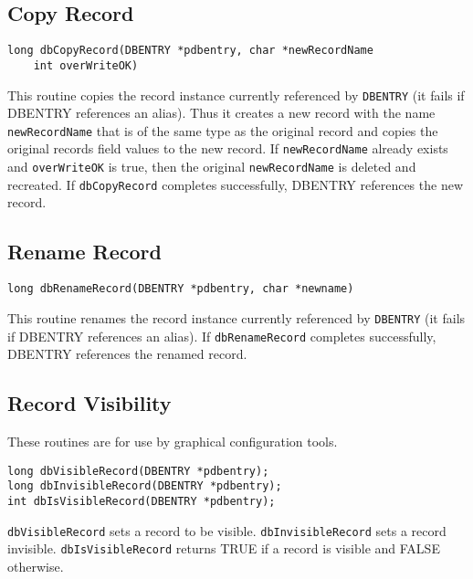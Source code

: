 \subsection{Copy Record}

\begin{verbatim}
long dbCopyRecord(DBENTRY *pdbentry, char *newRecordName
    int overWriteOK)
\end{verbatim}

This routine copies the record instance currently referenced by \verb|DBENTRY| (it fails if DBENTRY references an alias). Thus 
it creates a new record with the name \verb|newRecordName| that is of the same type as the original record and copies the 
original records field values to the new record. If \verb|newRecordName| already exists and \verb|overWriteOK| is true, then the 
original \verb|newRecordName| is deleted and recreated. If \verb|dbCopyRecord| completes successfully, DBENTRY references 
the new record.

\subsection{Rename Record}

\begin{verbatim}
long dbRenameRecord(DBENTRY *pdbentry, char *newname)
\end{verbatim}

This routine renames the record instance currently referenced by \verb|DBENTRY| (it fails if DBENTRY references an alias). If 
\verb|dbRenameRecord| completes successfully, DBENTRY references the renamed record.

\subsection{Record Visibility}

These routines are for use by graphical configuration tools.

\begin{verbatim}
long dbVisibleRecord(DBENTRY *pdbentry);
long dbInvisibleRecord(DBENTRY *pdbentry);
int dbIsVisibleRecord(DBENTRY *pdbentry);
\end{verbatim}

\verb|dbVisibleRecord| sets a record to be visible. \verb|dbInvisibleRecord| sets a record invisible. 
\verb|dbIsVisibleRecord| returns TRUE if a record is visible and FALSE otherwise.


